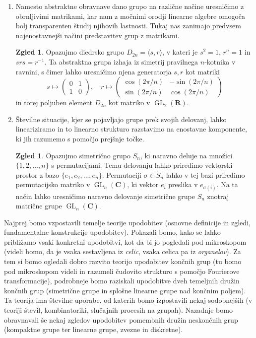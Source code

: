 \documentclass[11pt]{book}
\def\RR{\mathbf{R}}
\def\CC{\mathbf{C}}
\DeclareMathOperator\GL{GL}
\theoremstyle{definition}
\theoremstyle{zgled}
\theoremstyle{zgledbrezstevilke}
\newtheorem{zgledbrezstevilke}[theorem]{Zgled}
\theoremstyle{odprtproblem}
\theoremstyle{domacanaloga}
\theoremstyle{izrek}
\begin{document}
\begin{enumerate}
    \item Namesto abstraktne obravnave dano grupo na različne načine uresničimo z obrnljivimi matrikami, kar nam z močnimi orodji linearne algebre omogoča bolj transparenten študij njihovih lastnosti. Tukaj nas zanimajo predvsem najenostavnejši načini predstavitev grup z matrikami.
    
    \begin{zgledbrezstevilke}
        Opazujmo diedrsko grupo $D_{2n} = \langle s, r \rangle$, v kateri je $s^2 = 1$, $r^n = 1$ in $s r s = r^{-1}$. Ta abstraktna grupa izhaja iz simetrij pravilnega $n$-kotnika v ravnini, s čimer lahko uresničimo njena generatorja $s,r$ kot matriki
        \[
            s \mapsto \begin{pmatrix}
                0 & 1 \\ 1 & 0
            \end{pmatrix}, \quad
            r \mapsto \begin{pmatrix}
                \cos(2 \pi/n) & - \sin(2 \pi/n) \\
                \sin(2 \pi/n) & \cos(2 \pi/n)
            \end{pmatrix}
        \]
        in torej poljuben element $D_{2n}$ kot matriko v $\GL_2(\RR)$.
    \end{zgledbrezstevilke}

    \item Številne situacije, kjer se pojavljajo grupe prek svojih delovanj, lahko lineariziramo in to linearno strukturo razstavimo na enostavne komponente, ki jih razumemo s pomočjo prejšnje točke.
    
    \begin{zgledbrezstevilke}
        Opazujmo simetrično grupo $S_n$, ki naravno deluje na množici $\{ 1, 2, \dots, n \}$ s permutacijami. Temu delovanju lahko priredimo vektorski prostor z bazo $\{ e_1, e_2, \dots, e_n \}$. Permutaciji $\sigma \in S_n$ lahko v tej bazi priredimo permutacijsko matriko v $\GL_n(\CC)$, ki vektor $e_i$ preslika v $e_{\sigma(i)}$. Na ta način lahko uresničimo naravno delovanje simetrične grupe $S_n$ znotraj matrične grupe $\GL_n(\CC)$.
    \end{zgledbrezstevilke}
\end{enumerate}

Najprej bomo vzpostavili temelje teorije upodobitev (osnovne definicije in zgledi, fundamentalne konstrukcije upodobitev). Pokazali bomo, kako se lahko približamo vsaki konkretni upodobitvi, kot da bi jo pogledali pod mikroskopom (videli bomo, da je vsaka sestavljena iz \emph{celic}, vsaka celica pa iz \emph{organelov}). Za tem si bomo ogledali dobro razvito teorijo upodobitev končnih grup (tu bomo pod mikroskopom videli in razumeli čudovito strukturo s pomočjo Fourierove transformacije), podrobneje bomo raziskali upodobitve dveh temeljnih družin končnih grup (simetrične grupe in splošne linearne grupe nad končnim poljem). Ta teorija ima številne uporabe, od katerih bomo izpostavili nekaj sodobnejših (v teoriji števil, kombinatoriki, slučajnih procesih na grupah). Nazadnje bomo obravnavali še nekaj zgledov upodobitev pomembnih družin neskončnih grup (kompaktne grupe ter linearne grupe, zvezne in diskretne).
\end{document}
